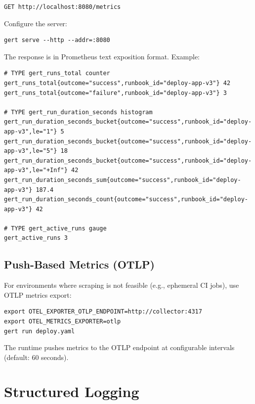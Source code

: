 \begin{verbatim}
GET http://localhost:8080/metrics
\end{verbatim}

Configure the server:

\begin{verbatim}
gert serve --http --addr=:8080
\end{verbatim}

The response is in Prometheus text exposition format. Example:

\begin{verbatim}
# TYPE gert_runs_total counter
gert_runs_total{outcome="success",runbook_id="deploy-app-v3"} 42
gert_runs_total{outcome="failure",runbook_id="deploy-app-v3"} 3

# TYPE gert_run_duration_seconds histogram
gert_run_duration_seconds_bucket{outcome="success",runbook_id="deploy-app-v3",le="1"} 5
gert_run_duration_seconds_bucket{outcome="success",runbook_id="deploy-app-v3",le="5"} 18
gert_run_duration_seconds_bucket{outcome="success",runbook_id="deploy-app-v3",le="+Inf"} 42
gert_run_duration_seconds_sum{outcome="success",runbook_id="deploy-app-v3"} 187.4
gert_run_duration_seconds_count{outcome="success",runbook_id="deploy-app-v3"} 42

# TYPE gert_active_runs gauge
gert_active_runs 3
\end{verbatim}

\subsection{Push-Based Metrics (OTLP)}

For environments where scraping is not feasible (e.g., ephemeral CI jobs), use OTLP metrics export:

\begin{verbatim}
export OTEL_EXPORTER_OTLP_ENDPOINT=http://collector:4317
export OTEL_METRICS_EXPORTER=otlp
gert run deploy.yaml
\end{verbatim}

The runtime pushes metrics to the OTLP endpoint at configurable intervals (default: 60 seconds).

\section{Structured Logging}

